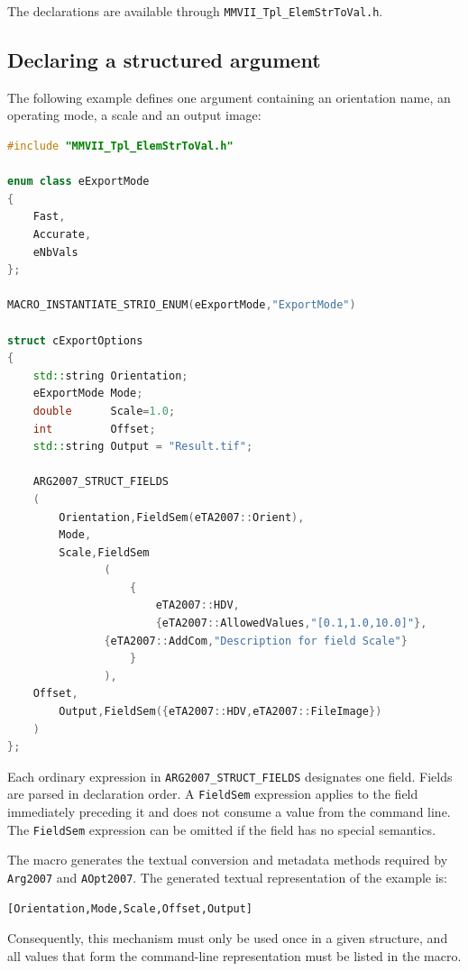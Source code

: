 The declarations are available through
\texttt{MMVII\_Tpl\_ElemStrToVal.h}.


\subsection{Declaring a structured argument}

The following example defines one argument containing an orientation name, an
operating mode, a scale and an output image:

\begin{lstlisting}[language=C++]
#include "MMVII_Tpl_ElemStrToVal.h"

enum class eExportMode
{
    Fast,
    Accurate,
    eNbVals
};

MACRO_INSTANTIATE_STRIO_ENUM(eExportMode,"ExportMode")

struct cExportOptions
{
    std::string Orientation;
    eExportMode Mode;
    double      Scale=1.0;
    int         Offset;
    std::string Output = "Result.tif";

    ARG2007_STRUCT_FIELDS
    (
        Orientation,FieldSem(eTA2007::Orient),
        Mode,
        Scale,FieldSem
               (
                   {
                       eTA2007::HDV,
                       {eTA2007::AllowedValues,"[0.1,1.0,10.0]"},
		       {eTA2007::AddCom,"Description for field Scale"}
                   }
               ),
	Offset,
        Output,FieldSem({eTA2007::HDV,eTA2007::FileImage})
    )
};
\end{lstlisting}

Each ordinary expression in \texttt{ARG2007\_STRUCT\_FIELDS} designates one
field.  Fields are parsed in declaration order.  A \texttt{FieldSem} expression
applies to the field immediately preceding it and does not consume a value from
the command line. The \texttt{FieldSem} expression can be omitted if the field 
has no special semantics.

The macro generates the textual conversion and metadata methods required by
\texttt{Arg2007} and \texttt{AOpt2007}.  The generated textual representation of
the example is:

\begin{verbatim}
[Orientation,Mode,Scale,Offset,Output]
\end{verbatim}

Consequently, this mechanism must only be used once in a given structure, and all
values that form the command-line representation must be listed in the macro.


